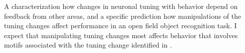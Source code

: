 \documentclass[COG,11pt]{ercgrant}
\begin{document}
 A characterization how changes in neuronal tuning with behavior depend on feedback from other areas, and a specific prediction how manipulations of the tuning changes affect performance in an open field object recognition task. 
I expect that manipulating tuning changes most affects behavior that involves motifs associated with the tuning change identified in . 


\end{document}
